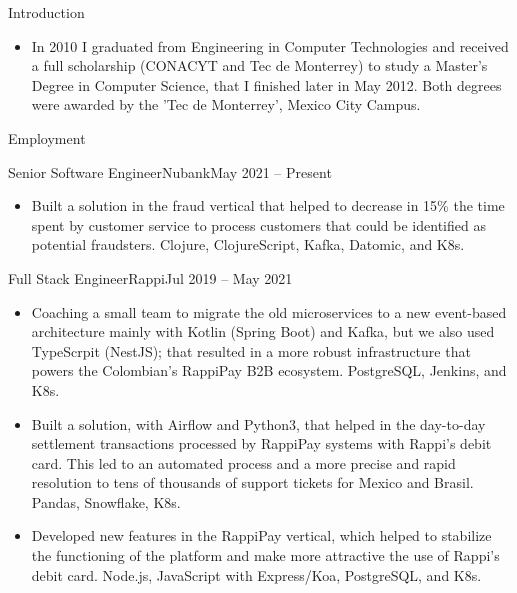 \documentclass[calibri]{../macdowell-cv/mcdowellcv}
\begin{document}
	\makeheader
	
	\begin{cvsection}{Introduction}
		\begin{cvsubsection}{}{}{}
			\begin{itemize}
					\item In 2010 I graduated from Engineering in Computer Technologies and received a full scholarship (CONACYT and Tec de Monterrey) to study a Master’s Degree in Computer Science, that I finished later in May 2012. Both degrees were awarded by the ’Tec de Monterrey’, Mexico City Campus.
			\end{itemize}
		\end{cvsubsection}
	\end{cvsection}

	\begin{cvsection}{Employment}
		\begin{cvsubsection}{Senior Software Engineer}{Nubank}{May 2021 -- Present}
			\begin{itemize}
				\item Built a solution in the fraud vertical that helped to decrease in 15\% the time spent by customer service to process customers that could be identified as potential fraudsters. Clojure, ClojureScript, Kafka, Datomic, and K8s.
			\end{itemize}
		\end{cvsubsection}

		\begin{cvsubsection}{Full Stack Engineer}{Rappi}{Jul 2019 -- May 2021}
			\begin{itemize}
				\item Coaching a small team to migrate the old microservices to a new event-based architecture mainly with Kotlin (Spring Boot) and Kafka, but we also used TypeScrpit (NestJS); that resulted in a more robust infrastructure that powers the Colombian's RappiPay B2B ecosystem. PostgreSQL, Jenkins, and K8s.
				\item Built a solution, with Airflow and Python3, that helped in the day-to-day settlement transactions processed by RappiPay systems with Rappi's debit card. This led to an automated process and a more precise and rapid resolution to tens of thousands of support tickets for Mexico and Brasil. Pandas, Snowflake, K8s.
				\item Developed new features in the RappiPay vertical, which helped to stabilize the functioning of the platform and make more attractive the use of Rappi's debit card. Node.js, JavaScript with Express/Koa, PostgreSQL, and K8s.
			\end{itemize}
		\end{cvsubsection}


\end{cvsection}
\end{document}
